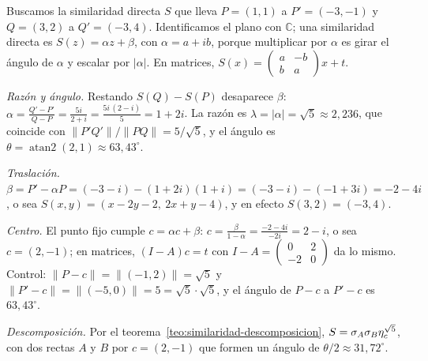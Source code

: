 \begin{center}
\end{center}

\begin{ejemplo}\label{ej:similaridad-segmento}
Buscamos la similaridad directa \(S\) que lleva \(P=(1,1)\) a \(P'=(-3,-1)\) y \(Q=(3,2)\) a
\(Q'=(-3,4)\). Identificamos el plano con \(\mathbb{C}\); una similaridad directa es
\(S(z)=\alpha z+\beta\), con \(\alpha=a+ib\), porque multiplicar por \(\alpha\) es girar
el ángulo de \(\alpha\) y escalar por \(\lvert\alpha\rvert\). En matrices,
\(S(x)=\left(\begin{smallmatrix}a&-b\\b&a\end{smallmatrix}\right)x+t\).

\emph{Razón y ángulo.} Restando \(S(Q)-S(P)\) desaparece \(\beta\):
\(\alpha=\frac{Q'-P'}{Q-P}=\frac{5i}{2+i}=\frac{5i\,(2-i)}{5}=1+2i\). La razón es \(\lambda=\lvert\alpha\rvert=\sqrt5\approx2{,}236\), que coincide con
\(\lVert P'Q'\rVert/\lVert PQ\rVert=5/\sqrt5\), y el ángulo es
\(\theta=\operatorname{atan2}(2,1)\approx63{,}43^\circ\).

\emph{Traslación.} \(\beta=P'-\alpha P=(-3-i)-(1+2i)(1+i)=(-3-i)-(-1+3i)=-2-4i\), o sea \(S(x,y)=(x-2y-2,\ 2x+y-4)\), y en efecto \(S(3,2)=(-3,4)\).

\emph{Centro.} El punto fijo cumple \(c=\alpha c+\beta\):
\(c=\frac{\beta}{1-\alpha}=\frac{-2-4i}{-2i}=2-i\), o sea \(c=(2,-1)\); en matrices, \((I-A)c=t\) con
\(I-A=\left(\begin{smallmatrix}0&2\\-2&0\end{smallmatrix}\right)\) da lo mismo. Control:
\(\lVert P-c\rVert=\lVert(-1,2)\rVert=\sqrt5\) y \(\lVert P'-c\rVert=\lVert(-5,0)\rVert=5=\sqrt5\cdot\sqrt5\),
y el ángulo de \(P-c\) a \(P'-c\) es \(63{,}43^\circ\).

\emph{Descomposición.} Por el teorema~\ref{teo:similaridad-descomposicion},
\(S=\sigma_{A}\sigma_{B}\eta_{c}^{\sqrt5}\), con dos rectas \(A\) y \(B\) por \(c=(2,-1)\) que
formen un ángulo de \(\theta/2\approx31{,}72^\circ\).
\end{ejemplo}

